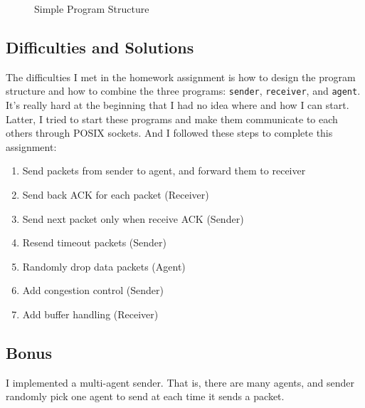 \documentclass[12pt,a4paper]{extarticle}
\begin{document}
\begin{figure}[H]
	\centering
	\hfill
	\caption{Simple Program Structure}
\end{figure}

\subsection{Difficulties and Solutions}

The difficulties I met in the homework assignment is how to design the program structure and how to combine the three programs: \texttt{sender}, \texttt{receiver}, and \texttt{agent}. It's really hard at the beginning that I had no idea where and how I can start. Latter, I tried to start these programs and make them communicate to each others through POSIX sockets. And I followed these steps to complete this assignment:
\begin{enumerate}
	\item Send packets from sender to agent, and forward them to receiver
	\item Send back ACK for each packet (Receiver)
	\item Send next packet only when receive ACK (Sender)
	\item Resend timeout packets (Sender)
	\item Randomly drop data packets (Agent)
	\item Add congestion control (Sender)
	\item Add buffer handling (Receiver)
\end{enumerate}

\subsection{Bonus}

I implemented a multi-agent sender. That is, there are many agents, and sender randomly pick one agent to send at each time it sends a packet.
\end{document}
